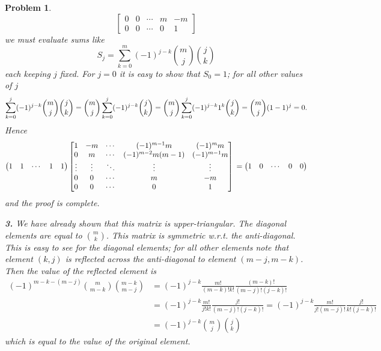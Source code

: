 \documentclass{article}
\newcommand{\subno}[1]{\par\noindent\textbf{#1}}
\theoremstyle{pprop}
\newtheorem{problem}{Problem}[section]
\begin{document}
\begin{problem}
$$\begin{bmatrix}
0  & 0 & \cdots &m &-m\\
0 & 0 & \cdots & 0 & 1
\end{bmatrix}
$$
we must evaluate sums like
$$
S_j=\sum_{k=0}^m (-1)^{j-k} \binom{m}{j} \binom{j}{k}
$$
each keeping $j$ fixed. For $j=0$ it is easy to show that $S_0=1$;
for all other values of $j$
$$
\sum_{k=0}^j (-1)^{j-k} \binom{m}{j} \binom{j}{k}=
\binom{m}{j}\sum_{k=0}^j (-1)^{j-k}  \binom{j}{k}=\\
\binom{m}{j}\sum_{k=0}^j (-1)^{j-k} 1^k  \binom{j}{k}=
\binom{m}{j}(1-1)^j=0.
$$
Hence
$$
\begin{pmatrix} 1 & 1 & \cdots & 1 & 1 \end{pmatrix}
\begin{bmatrix}
1 & -m & \cdots & (-1)^{m-1}m & (-1)^{m}m\\ 
0 & m & \cdots &   (-1)^{m-2}m(m-1)&   (-1)^{m-1}m\\
\vdots & \vdots & \ddots & \vdots & \vdots\\ 
0  & 0 & \cdots &m &-m\\
0 & 0 & \cdots & 0 & 1
\end{bmatrix}  \\ 
=\begin{pmatrix} 1 & 0 & \cdots & 0 & 0 \end{pmatrix}
$$
and the proof is complete.
\subno{3.} We have already shown that this matrix is upper-triangular. The diagonal elements are equal to $\binom{m}{k}$.  
This matrix is symmetric w.r.t. the anti-diagonal. This is easy to see for the diagonal elements; for all other elements note 
that element $(k,j)$ is reflected across the anti-diagonal to element $(m-j,m-k)$. Then the value of the reflected element is 
\begin{align*}
(-1)^{m-k-(m-j)} \binom{m}{m-k}\binom{m-k}{m-j}& =
(-1)^{j-k}\frac{m!}{(m-k)!k!}\frac{(m-k)!}{(m-j)!(j-k)!}\\
&=(-1)^{j-k}\frac{m!}{j!k!}\frac{j!}{(m-j)!(j-k)!}=
(-1)^{j-k}\frac{m!}{j!(m-j)!}\frac{j!}{k!(j-k)!}\\
&=(-1)^{j-k}\binom{m}{j}\binom{j}{k}
\end{align*}
which is equal to the value of the original element.


\end{problem}
\end{document}
